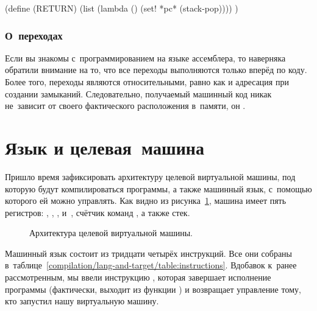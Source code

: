 \begin{code:lisp}
(define (RETURN)
  (list (lambda () (set! *pc* (stack-pop)))) )
\end{code:lisp}


\subsubsection{О~переходах}\label{compilation/bytes/sssect:jumps}

Если вы знакомы с~программированием на языке ассемблера, то наверняка обратили
внимание на то, что все переходы выполняются только вперёд по коду. Более того,
переходы являются относительными, равно как и адресация при создании замыканий.
Следовательно, получаемый машинный код никак не~зависит от своего фактического
расположения в~памяти, он .


\section{Язык и целевая~машина}\label{compilation/sect:lang-and-target}

Пришло время зафиксировать архитектуру целевой виртуальной машины, под которую
будут компилироваться программы, а также машинный язык, с~помощью которого ей
можно управлять. Как видно из
рисунка~\ref{compilation/lang-and-target/pic:subj}, машина имеет пять регистров:
, , ,  и~, счётчик команд
, а также стек.

\begin{figure}[tp]\begin{center}
\end{center}%
\caption{Архитектура целевой виртуальной машины.}%
\label{compilation/lang-and-target/pic:subj}%
\end{figure}

Машинный язык состоит из тридцати четырёх инструкций. Все они собраны
в~таблице~\ref{compilation/lang-and-target/table:instructions}. Вдобавок к~ранее
рассмотренным, мы ввели инструкцию , которая завершает исполнение
программы (фактически, выходит из функции ) и возвращает управление
тому, кто запустил нашу виртуальную машину.

